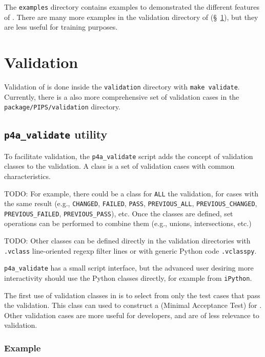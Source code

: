 \documentclass[a4paper]{article}
\begin{document}
The \texttt{examples} directory contains examples to demonstrated the
different features
of \Apfa. There are many more examples in the validation directory of \Apfa
(\S~\ref{sec:validation}), but they are less useful for training
purposes.

\section{Validation}
\label{sec:validation}


Validation of \Apfa is done inside the \texttt{validation} directory with
\texttt{make validate}. Currently, there is a also more comprehensive set of
validation cases in the \texttt{package/PIPS/validation} directory.


\subsection{\protect\texttt{p4a\_validate} utility}
\label{sec:p4a_validate-utility}


To facilitate validation, the \verb|p4a_validate|
script adds the concept of validation classes to the \Apips
validation. A class is a set of validation cases with common characteristics.

TODO: For example, there could be a class for \texttt{ALL} the
validation, for cases with the same result (e.g.,
\texttt{CHANGED}, \texttt{FAILED}, \texttt{PASS}, \verb|PREVIOUS_ALL|,
\verb|PREVIOUS_CHANGED|, \verb|PREVIOUS_FAILED|, \verb|PREVIOUS_PASS|),
etc. Once the classes are defined, set operations can be performed to combine
them (e.g., unions, intersections, etc.)

TODO: Other classes can be defined directly in the validation
directories with \texttt{.vclass} line-oriented regexp filter lines or with
generic Python code \texttt{.vclasspy}.

\verb|p4a_validate| has a small script interface, but the advanced
user desiring more interactivity
should use the Python classes directly, for example from \texttt{iPython}.

The first use of validation classes in \Apfa is to select from \Apips
only the test cases that pass the \Apips validation. This class can used to
construct a
\Amat (Minimal Acceptance Test) for \Apfa. Other \Apips validation
cases are more useful for \Apips developers, and are of less relevance
to \Apfa validation.

\subsubsection{Example}
\label{sec:example}
\end{document}
